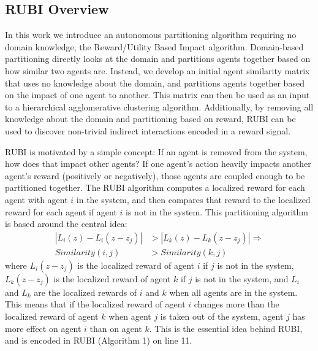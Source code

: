 \documentclass[letterpaper]{article}
\begin{document}
\subsection{RUBI Overview}
In this work we introduce an autonomous partitioning algorithm requiring no domain knowledge, the Reward/Utility Based Impact algorithm. Domain-based partitioning directly looks at the domain and partitions agents together based on how similar two agents are. Instead, we develop an initial agent similarity matrix that uses no knowledge about the domain, and partitions agents together based on the impact of one agent to another. This matrix can then be used as an input to a hierarchical agglomerative clustering algorithm. Additionally, by removing all knowledge about the domain and partitioning based on reward, RUBI can be used to discover non-trivial indirect interactions encoded in a reward signal.


RUBI is motivated by a simple concept: If an agent is removed from the system, how does that impact other agents? If one agent's action heavily impacts another agent's reward (positively or negatively), those agents are coupled enough to be partitioned together. The RUBI algorithm computes a localized reward for each agent with agent $i$ in the system, and then compares that reward to the localized reward for each agent if agent $i$ is not in the system. This partitioning algorithm is based around the central idea:
%
\begin{align}
|L_i(z) - L_i(z-z_j)| &> |L_k(z) - L_k(z-z_j)|   \Rightarrow \\
Similarity(i,j) &> Similarity(k,j) \nonumber
\end{align}
%
where $L_i(z-z_j)$ is the localized reward of agent $i$ if $j$ is not in the system, $L_k(z-z_j)$ is the localized reward of agent $k$ if $j$ is not in the system, and $L_i$ and $L_k$ are the localized rewards of $i$ and $k$ when all agents are in the system. This means that if the localized reward of agent $i$ changes more than the localized reward of agent $k$ when agent $j$ is taken out of the system, agent $j$ has more effect on agent $i$ than on agent $k$. This is the essential idea behind RUBI, and is encoded in RUBI (Algorithm 1) on line 11.

%
%
\end{document}
